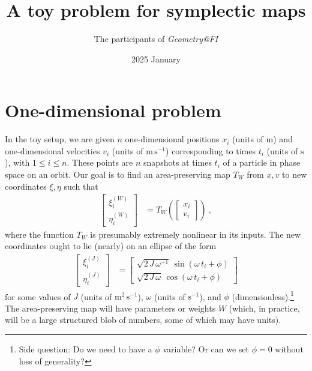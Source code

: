 \documentclass{article}
\title{\bfseries%
A toy problem for symplectic maps}
\author{The participants of \textsl{Geometry@FI}}
\date{2025 January}
\newcommand{\unit}[1]{\mathrm{#1}}
\newcommand{\m}{\unit{m}}
\newcommand{\s}{\unit{s}}
\newcommand{\ps}{\s^{-1}}
\newcommand{\mps}{\m\,\ps}
\newcommand{\mmps}{\m^2\,\ps}
\begin{document}
\maketitle

\section{One-dimensional problem}
In the toy setup, we are given $n$ one-dimensional positions $x_i$ (units of $\m$) and one-dimensional velocities $v_i$ (units of $\mps$) corresponding to times $t_i$ (units of $\s$), with $1\leq i\leq n$.
These points are $n$ snapshots at times $t_i$ of a particle in phase space on an orbit.
Our goal is to find an area-preserving map $T_W$ from $x, v$ to new coordinates $\xi, \eta$ such that
\begin{align}
    \begin{bmatrix}\xi^{(W)}_i \\ \eta^{(W)}_i\end{bmatrix} &= T_W\left(\begin{bmatrix}x_i \\ v_i\end{bmatrix}\right) ~,
\end{align}
where the function $T_W$ is presumably extremely nonlinear in its inputs.
The new coordinates ought to lie (nearly) on an ellipse of the form
\begin{align}
    \begin{bmatrix}\xi^{(J)}_i \\ \eta^{(J)}_i\end{bmatrix} &= \begin{bmatrix}\sqrt{2\,J\,\omega^{-1}}\,\sin(\omega\,t_i+\phi) \\ \sqrt{2\,J\,\omega}\,\cos(\omega\,t_i+\phi)\end{bmatrix}
\end{align}
for some values of $J$ (units of $\mmps$), $\omega$ (units of $\ps$), and $\phi$ (dimensionless).\footnote{Side question: Do we need to have a $\phi$ variable? Or can we set $\phi=0$ without loss of generality?}
The area-preserving map will have parameters or weights $W$ (which, in practice, will be a large structured blob of numbers, some of which may have units).
\end{document}

